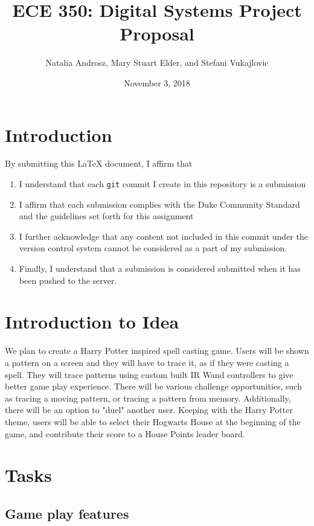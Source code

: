 \documentclass[letterpaper]{article} %
\begin{document}
\title{ECE 350: Digital Systems Project Proposal}
\author{Natalia Androsz, Mary Stuart Elder, and Stefani Vukajlovic} %
\date{November 3, 2018} %
\maketitle

\section{Introduction}

By submitting this \LaTeX{} document, I affirm that
\begin{enumerate}
    \item I understand that each \texttt{git} commit I create in this repository is a submission
    \item I affirm that each submission complies with the Duke Community Standard and the guidelines set forth for this assignment
    \item I further acknowledge that any content not included in this commit under the version control system cannot be considered as a part of my submission.
    \item Finally, I understand that a submission is considered submitted when it has been pushed to the server.
\end{enumerate}

\section{Introduction to Idea}
We plan to create a Harry Potter inspired spell casting game. Users will be shown a pattern on a screen and they will have to trace it, as if they were casting a spell. They will trace patterns using custom built IR Wand controllers to give better game play experience. There will be various challenge opportunities, such as tracing a moving pattern, or tracing a pattern from memory. Additionally, there will be an option to "duel" another user. Keeping with the Harry Potter theme, users will be able to select their Hogwarts House at the beginning of the game, and contribute their score to a House Points leader board.


\section{Tasks}

\subsection{Game play features}
\end{document}
